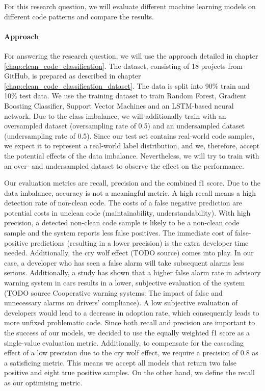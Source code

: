 For this research question, we will evaluate different machine learning models on different code patterns and compare the results.

\paragraph{Approach}
For answering the research question, we will use the approach detailed in chapter \ref{chap:clean_code_classification}.  The dataset, consisting of 18 projects from GitHub, is prepared as described in chapter \ref{chap:clean_code_classification_dataset}. The data is split into 90\% train and 10\% test data. We use the training dataset to train Random Forest, Gradient Boosting Classifier, Support Vector Machines and an LSTM-based neural network. Due to the class imbalance, we will additionally train with an oversampled dataset (oversampling rate of 0.5) and an undersampled dataset (undersampling rate of 0.5). Since our test set contains real-world code samples, we expect it to represent a real-world label distribution, and we, therefore, accept the potential effects of the data imbalance. Nevertheless, we will try to train with an over- and undersampled dataset to observe the effect on the performance.

Our evaluation metrics are recall, precision and the combined f1 score. Due to the data imbalance, accuracy is not a meaningful metric. A high recall means a high detection rate of non-clean code. The costs of a false negative prediction are potential costs in unclean code (maintainability, understandability). With high precision, a detected non-clean code sample is likely to be a non-clean code sample and the system reports less false positives. The immediate cost of false-positive predictions (resulting in a lower precision) is the extra developer time needed. Additionally, the cry wolf effect (TODO source) comes into play. In our case, a developer who has seen a false alarm will take subsequent alarms less serious. Additionally, a study has shown that a higher false alarm rate in advisory warning system in cars results in a lower, subjective evaluation of the system (TODO source Cooperative warning systems: The impact of false and unnecessary alarms on drivers' compliance). A low subjective evaluation of developers would lead to a decrease in adoption rate, which consequently leads to more unfixed problematic code. Since both recall and precision are important to the success of our models, we decided to use the equally weighted f1 score as a single-value evaluation metric.
Additionally, to compensate for the cascading effect of a low precision due to the cry wolf effect, we require a precision of 0.8 as a satisficing metric. This means we accept all models that return two false positive and eight true positive samples. On the other hand, we define the recall as our optimising metric.

